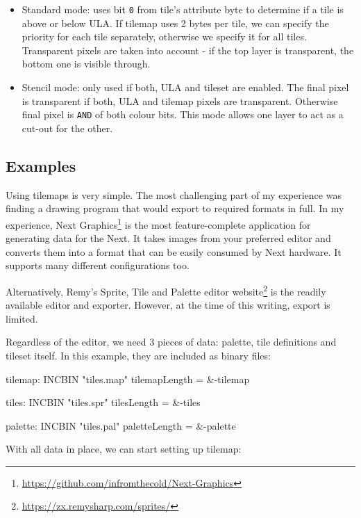 \begin{itemize}[topsep=1pt,itemsep=1pt]
	\item Standard mode: uses bit {\tt 0} from tile's attribute byte to determine if a tile is above or below ULA. If tilemap uses 2 bytes per tile, we can specify the priority for each tile separately, otherwise we specify it for all tiles. Transparent pixels are taken into account - if the top layer is transparent, the bottom one is visible through.
	
	\item Stencil mode: only used if both, ULA and tileset are enabled. The final pixel is transparent if both, ULA and tilemap pixels are transparent. Otherwise final pixel is {\tt AND} of both colour bits. This mode allows one layer to act as a cut-out for the other.
\end{itemize}


\subsection{Examples}

Using tilemaps is very simple. The most challenging part of my experience was finding a drawing program that would export to required formats in full. In my experience, Next Graphics\footnote{\url{https://github.com/infromthecold/Next-Graphics}} is the most feature-complete application for generating data for the Next. It takes images from your preferred editor and converts them into a format that can be easily consumed by Next hardware. It supports many different configurations too.

Alternatively, Remy's Sprite, Tile and Palette editor website\footnote{\url{https://zx.remysharp.com/sprites/}} is the readily available editor and exporter. However, at the time of this writing, export is limited.

Regardless of the editor, we need 3 pieces of data: palette, tile definitions and tileset itself. In this example, they are included as binary files:

\begin{tcblisting}{}
tilemap:
    INCBIN "tiles.map"
tilemapLength = &-tilemap

tiles:
    INCBIN "tiles.spr"
tilesLength = &-tiles

palette:
    INCBIN "tiles.pal"
paletteLength = &-palette
\end{tcblisting}

With all data in place, we can start setting up tilemap:

